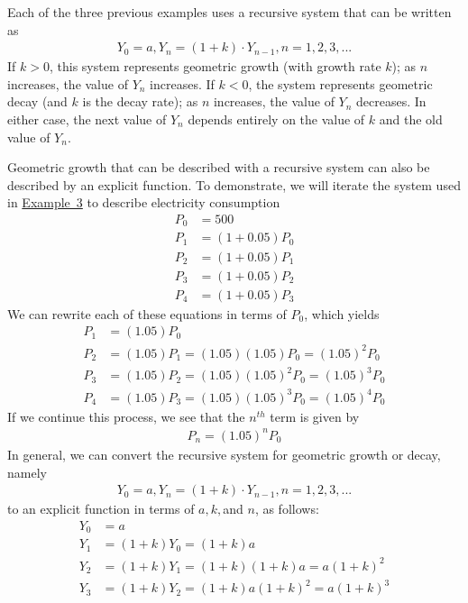\documentclass[10pt,]{book}
\theoremstyle{plain}
\theoremstyle{definition}
\theoremstyle{definition}
\theoremstyle{definition}
\numberwithin{equation}{section}
\newcommand{\lt}{<}
\newcommand{\gt}{>}
\begin{document}
\hypertarget{p-80}{}%
Each of the three previous examples uses a recursive system that can be written as%
%
\begin{gather*}
Y_0=a,Y_n=(1+k) \cdot Y_{n-1}, n=1,2,3, ...
\end{gather*}
\hypertarget{p-81}{}%
If \(k \gt 0\), this system represents geometric growth (with growth rate \(k\)); as \(n\) increases, the value of \(Y_n\)  increases.  If \(k \lt 0\), the system represents geometric decay (and \(k\) is the decay rate); as \(n\) increases, the value of \(Y_n\)  decreases.  In either case, the next value of \(Y_n\) depends entirely on the value of \(k\) and the old value of \(Y_n\).%
\par
\hypertarget{p-82}{}%
Geometric growth that can be described with a recursive system can also be described by an explicit function.  To demonstrate, we will iterate the system used in \hyperref[example-radioactive-decay]{Example~3} to describe electricity consumption%
%
\begin{align*}
P_0&=500\\
P_1&=(1+0.05)P_0\\
P_2&=(1+0.05)P_1\\
P_3&=(1+0.05)P_2\\
P_4&=(1+0.05)P_3
\end{align*}
\hypertarget{p-83}{}%
We can rewrite each of these equations in terms of \(P_0\), which yields%
%
\begin{align*}
P_1&=(1.05)P_0\\
P_2&=(1.05) P_1=(1.05) (1.05)P_0=(1.05)^2 P_0\\
P_3&=(1.05) P_2=(1.05) (1.05)^2 P_0=(1.05)^3 P_0\\
P_4&=(1.05) P_3=(1.05) (1.05)^3 P_0=(1.05)^4 P_0
\end{align*}
\hypertarget{p-84}{}%
If we continue this process, we see that the \(n^{th}\) term is given by%
%
\begin{gather*}
P_n=(1.05)^n P_0
\end{gather*}
\hypertarget{p-85}{}%
In general, we can convert the recursive system for geometric growth or decay, namely%
%
\begin{gather*}
Y_0=a,Y_n=(1+k) \cdot Y_{n-1}, n=1,2,3, ...
\end{gather*}
\hypertarget{p-86}{}%
to an explicit function in terms of \(a, k, \)and \(n\), as follows:%
%
\begin{align*}
Y_0&=a\\
Y_1&=(1+k)Y_0 = (1+k)a\\
Y_2&=(1+k)Y_1 = (1+k)(1+k)a = a(1+k)^2\\
Y_3&=(1+k)Y_2 = (1+k)a(1+k)^2 = a(1+k)^3
\end{align*}
\end{document}
